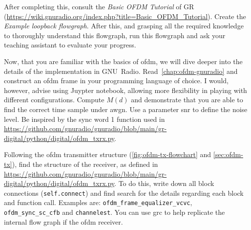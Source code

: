 After completing this, consult the \textit{Basic OFDM Tutorial} of GR (\url{https://wiki.gnuradio.org/index.php?title=Basic_OFDM_Tutorial}). Create the \textit{Example loopback flowgraph}. After this, and grasping all the required knowledge to thoroughly understand this flowgraph, run this flowgraph and ask your teaching assistant to evaluate your progress.


Now, that you are familiar with the basics of \gls{ofdm}, we will dive deeper into the details of the implementation in GNU~Radio. Read~\cref{chap:ofdm-gnuradio} and construct an \gls{ofdm} frame in your programming language of choice. I would, however, advise using Juypter notebook, allowing more flexibility in playing with different configurations. Compute $M(d)$ and demonstrate that you are able to find the correct time sample under \gls{awgn}. Use a parameter \gls{snr} to define the noise level. Be inspired by the sync word 1 function used in \url{https://github.com/gnuradio/gnuradio/blob/main/gr-digital/python/digital/ofdm_txrx.py}.

Following the \gls{ofdm} transmitter structure (\cref{fig:ofdm-tx-flowchart} and \cref{sec:ofdm-tx}), find the structure of the receiver, as defined in \url{https://github.com/gnuradio/gnuradio/blob/main/gr-digital/python/digital/ofdm_txrx.py}. To do this, write down all block connections (\texttt{self.connect}) and find search for the details regarding each block and function call. Examples are: \texttt{ofdm_frame_equalizer_vcvc}, \texttt{ofdm_sync_sc_cfb} and \texttt{channelest}. You can use \gls{grc} to help replicate the internal flow graph if the \gls{ofdm} receiver.